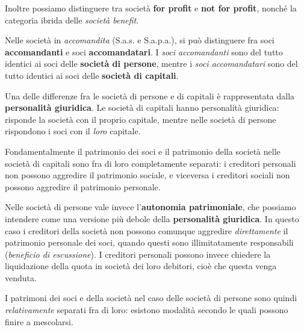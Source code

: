 \documentclass[a4paper,11pt]{article}
\begin{document}
Inoltre possiamo distinguere tra società \textbf{for profit} e \textbf{not for profit}, nonché la categoria ibrida delle \textit{società benefit}.

Nelle società in \textit{accomandita} (S.a.s. e S.a.p.a.), si può distinguere fra soci \textbf{accomandanti} e soci \textbf{accomandatari}.
I \textit{soci accomandanti} sono del tutto identici ai soci delle \textbf{società di persone}, mentre i \textit{soci accomandatari} sono del tutto identici ai soci delle \textbf{società di capitali}.

Una delle differenze fra le società di persone e di capitali è rappresentata dalla \textbf{personalità giuridica}.
Le società di capitali hanno personalità giuridica: risponde la società con il proprio capitale, mentre nelle società di persone rispondono i soci con il \textit{loro} capitale.

Fondamentalmente il patrimonio dei soci e il patrimonio della società nelle società di capitali sono fra di loro completamente separati: i creditori personali non possono aggredire il patrimonio sociale, e viceversa i creditori sociali non possono aggredire il patrimonio personale.

Nelle società di persone vale invece l'\textbf{autonomia patrimoniale}, che possiamo intendere come una versione più debole della \textbf{personalità giuridica}.
In questo caso i creditori della società non possono comunque aggredire \textit{direttamente} il patrimonio personale dei soci, quando questi sono illimitatamente responsabili (\textit{beneficio di escussione}).
I creditori personali possono invece chiedere la liquidazione della quota in società dei loro debitori, cioè che questa venga venduta.

I patrimoni dei soci e della società nel caso delle società di persone sono quindi \textit{relativamente} separati fra di loro: esistono modalità secondo le quali possono finire a mescolarsi.
\end{document}
